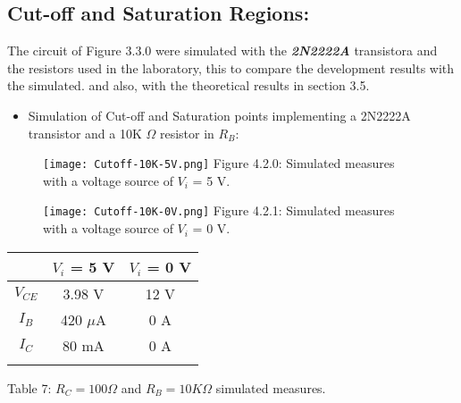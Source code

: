 \subsection{Cut-off and Saturation Regions:}

The circuit of Figure 3.3.0 were simulated with the {\bfseries\itshape 2N2222A} transistora and the resistors used in the laboratory, this to compare the development results with the simulated. and also, with the theoretical results in section 3.5.

{\bfseries\itshape
\begin{itemize}
\item Simulation of Cut-off and Saturation points implementing a 2N2222A transistor and a 10K $\Omega$ resistor in $R_{B}$:
\end{itemize}}

\begin{multicols}{2}
\begin{figure}[H]
\texttt{[image: Cutoff-10K-5V.png]}
\centering \linebreak \linebreak Figure 4.2.0: Simulated measures with a voltage source of $V_{i}$ = 5 V.
\end{figure}

\begin{figure}[H]
\texttt{[image: Cutoff-10K-0V.png]}
\centering \linebreak \linebreak Figure 4.2.1: Simulated measures with a voltage source of $V_{i}$ = 0 V.
\end{figure}
\end{multicols}

\begin{center}
\begin{tabular}[.5cm]{c c c}
\toprule
\toprule
\hspace{120pt} & \hspace{50pt} {\bfseries $V_{i}$ = 5 V} \hspace{50pt} & \hspace{50pt} {\bfseries $V_{i}$ = 0 V} \hspace{50pt} \\
\midrule
\midrule
$V_{CE}$ & 3.98 V & 12 V \\
\cmidrule{1-3}
$I_{B}$ & 420 $\mu$A & 0 A \\
\cmidrule{1-3}
$I_{C}$ & 80 mA & 0 A \\
\bottomrule
\linebreak
\end{tabular}
\linebreak Table 7: $R_{C} = 100 \Omega$ and $R_{B} = 10K \Omega$ simulated measures.
\end{center}

